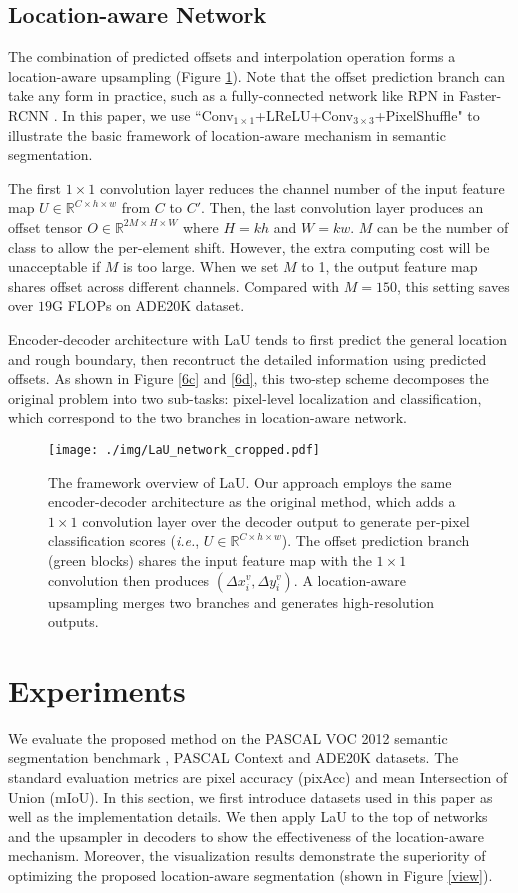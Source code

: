 \documentclass[10pt,twocolumn,letterpaper]{article}
\begin{document}
\subsection{Location-aware Network}
The combination of predicted offsets and interpolation operation forms a location-aware upsampling (Figure \ref{LaU_framework}). Note that the offset prediction branch can take any form in practice, such as a fully-connected network like RPN in Faster-RCNN \cite{RenHGS15}. In this paper, we use ``Conv$_{1\times1}$+LReLU+Conv$_{3\times3}$+PixelShuffle" to illustrate the basic framework of location-aware mechanism in semantic segmentation. 

The first $1\times1$ convolution layer reduces the channel number of the input feature map $U\in\mathbb{R}^{C\times h\times w}$ from $C$ to $C'$. Then, the last convolution layer produces an offset tensor $O\in\mathbb{R}^{2M\times H\times W}$ where $H=kh$ and $W=kw$. $M$ can be the number of class to allow the per-element shift. However, the extra computing cost will be unacceptable if $M$ is too large. When we set $M$ to 1, the output feature map shares offset across different channels. Compared with $M=150$, this setting saves over $19$G FLOPs on ADE20K dataset.

Encoder-decoder architecture with LaU tends to first predict the general location and rough boundary, then recontruct the detailed information using predicted offsets. As shown in Figure \ref{6c} and \ref{6d}, this two-step scheme decomposes the original problem into two sub-tasks: pixel-level localization and classification, which correspond to the two branches in location-aware network.

\begin{figure}
  \centering
  \texttt{[image: ./img/LaU\_network\_cropped.pdf]} 
  \caption{The framework overview of LaU. Our approach employs the same encoder-decoder architecture as the original method, which adds a $1\times1$ convolution layer over the decoder output to generate per-pixel classification scores (\textit{i.e.}, $U\in\mathbb{R}^{C\times h\times w}$). The offset prediction branch (green blocks) shares the input feature map with the $1\times1$ convolution then produces $(\Delta x_i^v,\Delta y_i^v)$. A location-aware upsampling merges two branches and generates high-resolution outputs.  }
\label{LaU_framework}
\end{figure}

\section{Experiments}
We evaluate the proposed method on the PASCAL VOC 2012 semantic segmentation benchmark \cite{EveringhamGWWZ10}, PASCAL Context \cite{MottaghiCLCLFUY14} and ADE20K \cite{ADE20K} datasets. The standard evaluation metrics are pixel accuracy  (pixAcc) and mean Intersection of Union (mIoU). In this section, we first introduce datasets used in this paper as well as the implementation details. We then apply LaU to the top of networks and the upsampler in decoders to show the effectiveness of the location-aware mechanism. Moreover, the visualization results demonstrate the superiority of optimizing the proposed location-aware segmentation (shown in Figure \ref{view}). 
\end{document}
